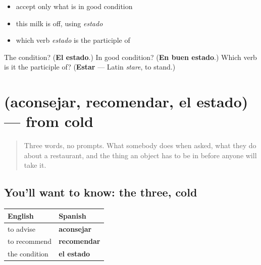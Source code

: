 \begin{itemize}
\raggedright
  \item accept only what is in good condition
  \item this milk is off, using \emph{estado}
  \item which verb \emph{estado} is the participle of
\end{itemize}

\begin{tcolorbox}[breakable,colback=teal!4,colframe=teal!35!black,title={Before you move on}]
The condition? (\textbf{El estado}.) In good condition? (\textbf{En buen estado}.) Which verb is it the participle of? (\textbf{Estar} — Latin \emph{stare}, to stand.)
\end{tcolorbox}
\section[(aconsejar, recomendar, el estado)]{(aconsejar, recomendar, el estado) — from cold}

\label{lesson:ES-R473-repaso-consejo}



\begin{quote}
Three words, no prompts. What somebody does when asked, what they do about a restaurant, and the thing an object has to be in before anyone will take it.
\end{quote}

\subsection*{You'll want to know: the three, cold}
\noindent
\begin{tabularx}{\linewidth}{@{}>{\raggedright\arraybackslash}X>{\raggedright\arraybackslash}X@{}}
\toprule
\textbf{English} & \textbf{Spanish} \\
\midrule
to advise & \textbf{aconsejar} \\
to recommend & \textbf{recomendar} \\
the condition & \textbf{el estado} \\
\bottomrule
\end{tabularx}

